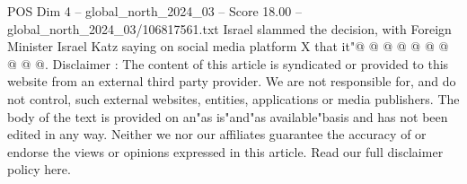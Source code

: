 \begin{textsample}{POS Dim 4 – global\_north\_2024\_03 – Score 18.00 – global\_north\_2024\_03/106817561.txt}
Israel slammed the decision, with Foreign Minister Israel Katz saying on social media platform X that it"@ @ @ @ @ @ @ @ @ @.
Disclaimer : The content of this article is syndicated or provided to this website from an external third party provider.
We are not responsible for, and do not control, such external websites, entities, applications or media publishers.
The body of the text is provided on an"as is"and"as available"basis and has not been edited in any way.
Neither we nor our affiliates guarantee the accuracy of or endorse the views or opinions expressed in this article.
Read our full disclaimer policy here.

\end{textsample}
